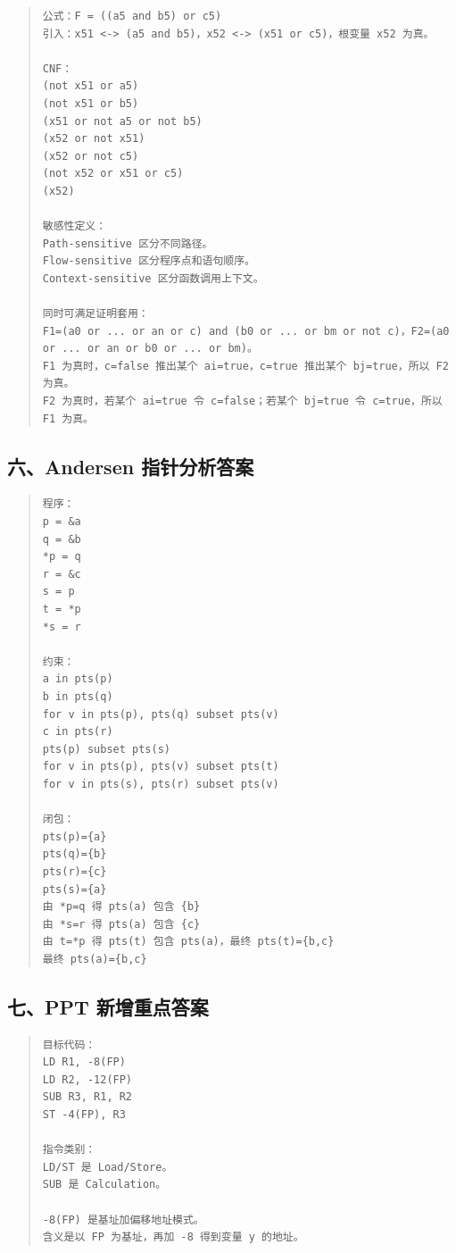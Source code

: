\documentclass[UTF8,zihao=-4]{ctexart}
\begin{document}
\begin{quote}
\footnotesize
\begin{verbatim}
公式：F = ((a5 and b5) or c5)
引入：x51 <-> (a5 and b5)，x52 <-> (x51 or c5)，根变量 x52 为真。

CNF：
(not x51 or a5)
(not x51 or b5)
(x51 or not a5 or not b5)
(x52 or not x51)
(x52 or not c5)
(not x52 or x51 or c5)
(x52)

敏感性定义：
Path-sensitive 区分不同路径。
Flow-sensitive 区分程序点和语句顺序。
Context-sensitive 区分函数调用上下文。

同时可满足证明套用：
F1=(a0 or ... or an or c) and (b0 or ... or bm or not c)，F2=(a0 or ... or an or b0 or ... or bm)。
F1 为真时，c=false 推出某个 ai=true，c=true 推出某个 bj=true，所以 F2 为真。
F2 为真时，若某个 ai=true 令 c=false；若某个 bj=true 令 c=true，所以 F1 为真。
\end{verbatim}
\end{quote}



\subsection{六、Andersen 指针分析答案}


\begin{quote}
\footnotesize
\begin{verbatim}
程序：
p = &a
q = &b
*p = q
r = &c
s = p
t = *p
*s = r

约束：
a in pts(p)
b in pts(q)
for v in pts(p), pts(q) subset pts(v)
c in pts(r)
pts(p) subset pts(s)
for v in pts(p), pts(v) subset pts(t)
for v in pts(s), pts(r) subset pts(v)

闭包：
pts(p)={a}
pts(q)={b}
pts(r)={c}
pts(s)={a}
由 *p=q 得 pts(a) 包含 {b}
由 *s=r 得 pts(a) 包含 {c}
由 t=*p 得 pts(t) 包含 pts(a)，最终 pts(t)={b,c}
最终 pts(a)={b,c}
\end{verbatim}
\end{quote}



\subsection{七、PPT 新增重点答案}


\begin{quote}
\footnotesize
\begin{verbatim}
目标代码：
LD R1, -8(FP)
LD R2, -12(FP)
SUB R3, R1, R2
ST -4(FP), R3

指令类别：
LD/ST 是 Load/Store。
SUB 是 Calculation。

-8(FP) 是基址加偏移地址模式。
含义是以 FP 为基址，再加 -8 得到变量 y 的地址。
\end{verbatim}
\end{quote}
\end{document}
